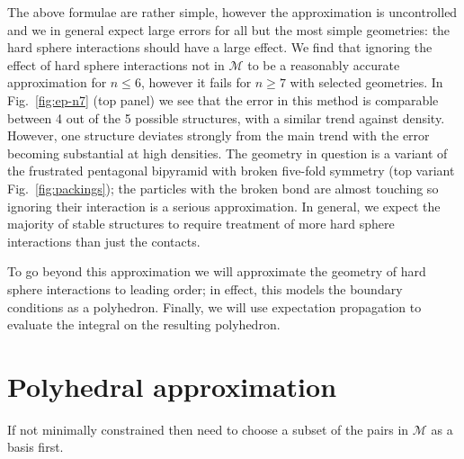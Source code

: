 \documentclass[11pt,twoside]{report}
\begin{document}
The above formulae are rather simple, however the approximation is uncontrolled and we in general expect large errors for all but the most simple geometries: the hard sphere interactions should have a large effect.
We find that ignoring the effect of hard sphere interactions not in $\mathcal{M}$ to be a reasonably accurate approximation for $n \le 6$, however it fails for $n \ge 7$ with selected geometries.
In Fig.\ \ref{fig:ep-n7} (top panel) we see that the error in this method is comparable between 4 out of the 5 possible structures, with a similar trend against density.
However, one structure deviates strongly from the main trend with the error becoming substantial at high densities.
The geometry in question is a variant of the frustrated pentagonal bipyramid with broken five-fold symmetry (top variant Fig.\ \ref{fig:packings}); the particles with the broken bond are almost touching so ignoring their interaction is a serious approximation.
In general, we expect the majority of stable structures to require treatment of more hard sphere interactions than just the contacts.

To go beyond this approximation we will approximate the geometry of hard sphere interactions to leading order; in effect, this models the boundary conditions as a polyhedron.
Finally, we will use expectation propagation to evaluate the integral on the resulting polyhedron.

\section{Polyhedral approximation}
\label{sec:polyhedral-approximation}

If not minimally constrained then need to choose a subset of the pairs in $\mathcal{M}$ as a basis first.
\end{document}
